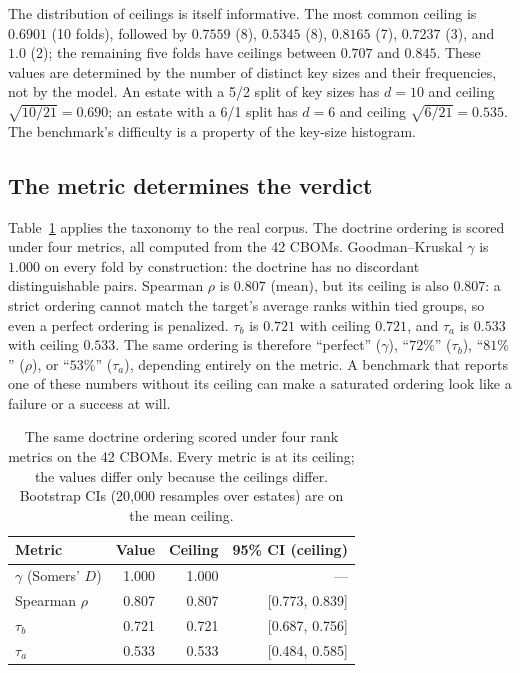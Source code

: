 \documentclass[conference,10pt]{IEEEtran}
\newcommand{\tb}{\tau_b}
\newcommand{\distinct}{d}
\begin{document}
The distribution of ceilings is itself informative. The most common ceiling is $0.6901$ (10
folds), followed by $0.7559$ (8), $0.5345$ (8), $0.8165$ (7), $0.7237$ (3), and $1.0$ (2); the
remaining five folds have ceilings between $0.707$ and $0.845$. These values are determined by
the number of distinct key sizes and their frequencies, not by the model. An estate with a 5/2
split of key sizes has $\distinct=10$ and ceiling $\sqrt{10/21}=0.690$; an estate with a 6/1
split has $\distinct=6$ and ceiling $\sqrt{6/21}=0.535$. The benchmark's difficulty is a
property of the key-size histogram.

\subsection{The metric determines the verdict}
\label{sec:metricverdict}

Table~\ref{tab:metricverdict} applies the taxonomy to the real corpus. The doctrine ordering is
scored under four metrics, all computed from the 42 CBOMs. Goodman--Kruskal $\gamma$ is $1.000$
on every fold by construction: the doctrine has no discordant distinguishable pairs. Spearman
$\rho$ is $0.807$ (mean), but its ceiling is also $0.807$: a strict ordering cannot match the
target's average ranks within tied groups, so even a perfect ordering is penalized. $\tb$ is
$0.721$ with ceiling $0.721$, and $\tau_a$ is $0.533$ with ceiling $0.533$. The same ordering is
therefore ``perfect'' ($\gamma$), ``$72\%$'' ($\tb$), ``$81\%$'' ($\rho$), or ``$53\%$''
($\tau_a$), depending entirely on the metric. A benchmark that reports one of these numbers
without its ceiling can make a saturated ordering look like a failure or a success at will.

\begin{table}[t]
\centering
\caption{The same doctrine ordering scored under four rank metrics on the 42 CBOMs. Every
metric is at its ceiling; the values differ only because the ceilings differ. Bootstrap CIs
(20{,}000 resamples over estates) are on the mean ceiling.}
\label{tab:metricverdict}
\footnotesize
\begin{tabular}{@{}lrrr@{}}
\toprule
Metric & Value & Ceiling & 95\% CI (ceiling) \\
\midrule
$\gamma$ (Somers' $D$) & 1.000 & 1.000 & --- \\
Spearman $\rho$ & 0.807 & 0.807 & [0.773, 0.839] \\
$\tb$ & 0.721 & 0.721 & [0.687, 0.756] \\
$\tau_a$ & 0.533 & 0.533 & [0.484, 0.585] \\
\bottomrule
\end{tabular}
\end{table}
\end{document}
